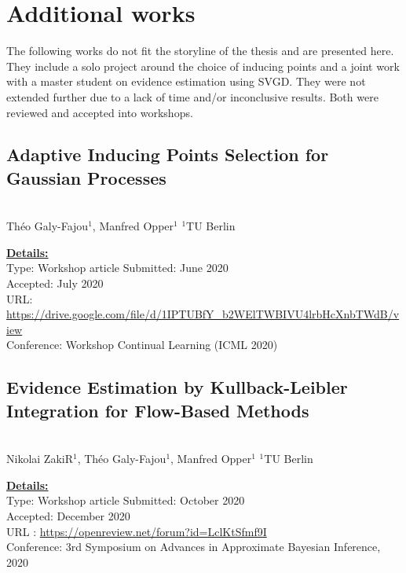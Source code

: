 \chapter{Additional works} 

The following works do not fit the storyline of the thesis and are presented here.
They include a solo project around the choice of inducing points and a joint work with a master student on evidence estimation using \ac{SVGD}.
They were not extended further due to a lack of time and/or inconclusive results.
Both were reviewed and accepted into workshops.


\section{Adaptive Inducing Points Selection for Gaussian Processes}

\textbf{}\\
Th\'eo Galy-Fajou$^1$, Manfred Opper$^1$
\small{$^1$TU Berlin}

\textbf{\underline{Details:}}\\
Type: Workshop article
Submitted: June 2020\\
Accepted: July 2020\\
URL: \url{https://drive.google.com/file/d/1IPTUBfY_b2WElTWBIVU4lrbHcXnbTWdB/view}\\
Conference: Workshop Continual Learning (ICML 2020)\\




\section{Evidence Estimation by Kullback-Leibler Integration for Flow-Based Methods}

\textbf{}\\
Nikolai ZakiR$^1$, Th\'eo Galy-Fajou$^1$, Manfred Opper$^1$
\small{$^1$TU Berlin}

\textbf{\underline{Details:}}\\
Type: Workshop article
Submitted: October 2020\\
Accepted: December 2020\\
URL : \url{https://openreview.net/forum?id=LclKtSfmf9I}\\
Conference: 3rd Symposium on Advances in Approximate Bayesian Inference, 2020\\


